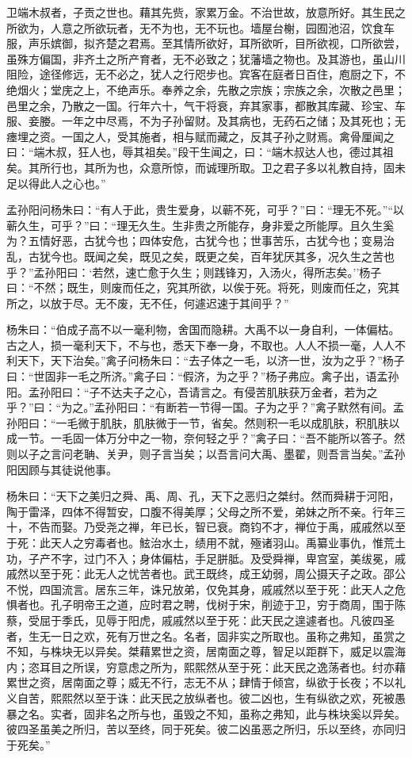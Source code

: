\documentclass[]{article}
\begin{document}
卫端木叔者，子贡之世也。藉其先赀，家累万金。不治世故，放意所好。其生民之所欲为，人意之所欲玩者，无不为也，无不玩也。墙屋台榭，园囿池沼，饮食车服，声乐嫔御，拟齐楚之君焉。至其情所欲好，耳所欲听，目所欲视，口所欲尝，虽殊方偏国，非齐土之所产育者，无不必致之；犹藩墙之物也。及其游也，虽山川阻险，途径修远，无不必之，犹人之行咫步也。宾客在庭者日百住，庖厨之下，不绝烟火；堂庑之上，不绝声乐。奉养之余，先散之宗族；宗族之余，次散之邑里；邑里之余，乃散之一国。行年六十，气干将衰，弃其家事，都散其库藏、珍宝、车服、妾媵。一年之中尽焉，不为子孙留财。及其病也，无药石之储；及其死也；无瘗埋之资。一国之人，受其施者，相与赋而藏之，反其子孙之财焉。禽骨厘闻之曰：``端木叔，狂人也，辱其祖矣。''段干生闻之，曰：``端木叔达人也，德过其祖矣。其所行也，其所为也，众意所惊，而诚理所取。卫之君子多以礼教自持，固未足以得此人之心也。''

孟孙阳问杨朱曰：``有人于此，贵生爱身，以蕲不死，可乎？''曰：``理无不死。''``以蕲久生，可乎？''曰：``理无久生。生非贵之所能存，身非爱之所能厚。且久生奚为？五情好恶，古犹今也；四体安危，古犹今也；世事苦乐，古犹今也；变易治乱，古犹今也。既闻之矣，既见之矣，既更之矣，百年犹厌其多，况久生之苦也乎？''孟孙阳曰：`若然，速亡愈于久生；则践锋刃，入汤火，得所志矣。''杨子曰：``不然；既生，则废而任之，究其所欲，以俟于死。将死，则废而任之，究其所之，以放于尽。无不废，无不任，何遽迟速于其间乎？''

杨朱曰：``伯成子高不以一毫利物，舍国而隐耕。大禹不以一身自利，一体偏枯。古之人，损一毫利天下，不与也，悉天下奉一身，不取也。人人不损一毫，人人不利天下，天下治矣。''禽子问杨朱曰：``去子体之一毛，以济一世，汝为之乎？''杨子曰：``世固非一毛之所济。''禽子曰：``假济，为之乎？''杨子弗应。禽子出，语孟孙阳。孟孙阳曰：``子不达夫子之心，吾请言之。有侵苦肌肤获万金者，若为之乎？''曰：``为之。''孟孙阳曰：``有断若一节得一国。子为之乎？''禽子默然有间。孟孙阳曰：``一毛微于肌肤，肌肤微于一节，省矣。然则积一毛以成肌肤，积肌肤以成一节。一毛固一体万分中之一物，奈何轻之乎？''禽子曰：``吾不能所以答子。然则以子之言问老聃、关尹，则子言当矣；以吾言问大禹、墨翟，则吾言当矣。''孟孙阳因顾与其徒说他事。

杨朱曰：``天下之美归之舜、禹、周、孔，天下之恶归之桀纣。然而舜耕于河阳，陶于雷泽，四体不得暂安，口腹不得美厚；父母之所不爱，弟妹之所不亲。行年三十，不告而娶。乃受尧之禅，年已长，智已衰。商钧不才，禅位于禹，戚戚然以至于死：此天人之穷毒者也。鮌治水土，绩用不就，殛诸羽山。禹纂业事仇，惟荒土功，子产不字，过门不入；身体偏枯，手足胼胝。及受舜禅，卑宫室，美绂冕，戚戚然以至于死：此无人之忧苦者也。武王既终，成王幼弱，周公摄天子之政。邵公不悦，四国流言。居东三年，诛兄放弟，仅免其身，戚戚然以至于死：此天人之危惧者也。孔子明帝王之道，应时君之聘，伐树于宋，削迹于卫，穷于商周，围于陈蔡，受屈于季氏，见辱于阳虎，戚戚然以至于死：此天民之遑遽者也。凡彼四圣者，生无一日之欢，死有万世之名。名者，固非实之所取也。虽称之弗知，虽赏之不知，与株块无以异矣。桀藉累世之资，居南面之尊，智足以距群下，威足以震海内；恣耳目之所误，穷意虑之所为，熙熙然从至于死：此天民之逸荡者也。纣亦藉累世之资，居南面之尊；威无不行，志无不从；肆情于倾宫，纵欲于长夜；不以礼义自苦，熙熙然以至于诛：此天民之放纵者也。彼二凶也，生有纵欲之欢，死被愚暴之名。实者，固非名之所与也，虽毁之不知，虽称之弗知，此与株块奚以异矣。彼四圣虽美之所归，苦以至终，同于死矣。彼二凶虽恶之所归，乐以至终，亦同归于死矣。''
\end{document}

